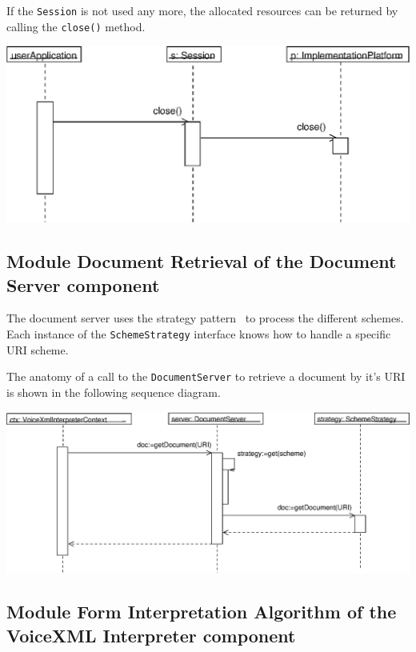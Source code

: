 \documentclass[11pt,a4paper]{article}
\begin{document}
If the \texttt{Session} is not used any more, the allocated resources
can be returned by calling the \texttt{close()} method.

\begin{center}
\includegraphics[scale=0.6]{seq-jvoicexml-sessionclose.eps}
\end{center}

\subsection{Module Document Retrieval of the Document Server component}
\label{sec:module-docum-serv}

The document server uses the strategy pattern~\cite{gamma:design_patterns} 
to process the different schemes.
Each instance of the \texttt{SchemeStrategy} interface knows how
to handle a specific URI scheme.

The anatomy of a call to the \texttt{DocumentServer} to retrieve a
document by it's URI is shown in the following sequence diagram.

\begin{center}
\includegraphics[scale=0.5]{seq-documentserver.eps}
\end{center}

\subsection{Module Form Interpretation Algorithm of the VoiceXML Interpreter 
component}
\label{sec:module-form-interpr}
\end{document}
